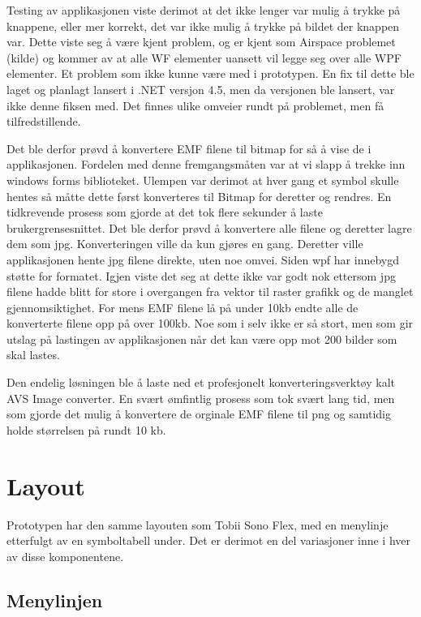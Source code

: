 Testing av applikasjonen viste derimot at det ikke lenger var mulig å trykke på knappene, eller mer korrekt, det var ikke mulig å trykke på  bildet der knappen var. Dette viste seg å være kjent problem, og er kjent som Airspace problemet (kilde) og kommer av at alle WF elementer uansett vil legge seg over alle WPF elementer. Et problem som ikke kunne være med i prototypen. En fix til dette ble laget og planlagt lansert i .NET versjon 4.5, men da versjonen ble lansert, var ikke denne fiksen med. Det finnes ulike omveier rundt på problemet, men få tilfredstillende. 

Det ble derfor prøvd å konvertere EMF filene til bitmap for så å vise de i applikasjonen. Fordelen med denne fremgangsmåten var at vi slapp å trekke inn windows forms biblioteket. Ulempen var derimot at hver gang et symbol skulle hentes så måtte dette først konverteres til Bitmap for deretter og rendres. En tidkrevende prosess som gjorde at det tok flere sekunder å laste brukergrensesnittet. Det ble derfor prøvd å konvertere alle filene og deretter lagre dem som jpg. Konverteringen ville da kun gjøres en gang. Deretter ville applikasjonen hente jpg filene direkte, uten noe omvei. Siden wpf har innebygd støtte for formatet. Igjen viste det seg at dette ikke var godt nok ettersom jpg filene hadde blitt for store i overgangen fra vektor til raster grafikk og de manglet gjennomsiktighet. For mens EMF filene lå på under 10kb endte alle de konverterte filene opp på over 100kb. Noe som i selv ikke er så stort, men som gir utslag på lastingen av applikasjonen når det kan være opp mot 200 bilder som skal lastes.

Den endelig løsningen ble å laste ned et profesjonelt konverteringsverktøy kalt AVS Image converter. En svært ømfintlig prosess som tok svært lang tid, men som gjorde det mulig å konvertere de orginale EMF filene til png og samtidig holde størrelsen på rundt 10 kb.





\section{Layout}

Prototypen har den samme layouten som Tobii Sono Flex, med en menylinje etterfulgt av en symboltabell under. Det er derimot en del variasjoner inne i hver av disse komponentene.

\subsection{Menylinjen}

